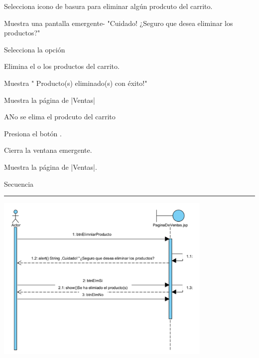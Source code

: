\begin{UCtrayectoria}
	
	\UCpaso[\UCactor] Selecciona icono de basura para eliminar algún prodcuto del carrito.
	
	\UCpaso[\UCsist]Muestra una pantalla emergente- "Cuidado! ¿Seguro que desea eliminar los productos?"

	\UCpaso[\UCactor] Selecciona la opción  

	\UCpaso[\UCsist]Elimina el o los productos del carrito.

	\UCpaso[\UCsist] Muestra " Producto(s) eliminado(s) con éxito!"

	\UCpaso[\UCsist]Muestra la página de |Ventas|


	
\end{UCtrayectoria}


\begin{UCtrayectoriaA}{A}{No se elima el prodcuto del carrito}

	\UCpaso[\UCactor] Presiona el botón .
	
	\UCpaso[\UCsist]Cierra la ventana emergente.

	\UCpaso[\UCsist]Muestra la página de |Ventas|.
	
\end{UCtrayectoriaA}

{
\begin{flushleft}
	\break


	\Large{Secuencia}\\
	\rule{14cm}{0.5pt}

	\includegraphics[height=8cm]{casouso/cu10/images/Diagram_Sequence.png}\\	
	
	
\end{flushleft}
}
